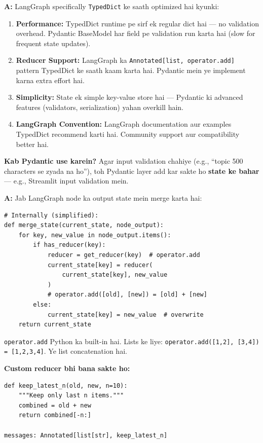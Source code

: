 \documentclass[12pt, a4paper]{article}
\begin{document}
\begin{interviewbox}[title={\faIcon{user-tie} ~Q3: TypedDict kyun use kiya? Pydantic BaseModel kyun nahi?}]
\textbf{A:} LangGraph specifically \texttt{TypedDict} ke saath optimized hai kyunki:

\begin{enumerate}
\item \textbf{Performance:} TypedDict runtime pe sirf ek regular dict hai --- no validation overhead. Pydantic BaseModel har field pe validation run karta hai (slow for frequent state updates).

\item \textbf{Reducer Support:} LangGraph ka \texttt{Annotated[list, operator.add]} pattern TypedDict ke saath kaam karta hai. Pydantic mein ye implement karna extra effort hai.

\item \textbf{Simplicity:} State ek simple key-value store hai --- Pydantic ki advanced features (validators, serialization) yahan overkill hain.

\item \textbf{LangGraph Convention:} LangGraph documentation aur examples TypedDict recommend karti hai. Community support aur compatibility better hai.
\end{enumerate}

\textbf{Kab Pydantic use karein?} Agar input validation chahiye (e.g., ``topic 500 characters se zyada na ho''), toh Pydantic layer add kar sakte ho \textbf{state ke bahar} --- e.g., Streamlit input validation mein.
\end{interviewbox}

\begin{interviewbox}[title={\faIcon{user-tie} ~Q4: \texttt{operator.add} reducer kaise internally kaam karta hai?}]
\textbf{A:} Jab LangGraph node ka output state mein merge karta hai:

\begin{lstlisting}[style=pythonstyle]
# Internally (simplified):
def merge_state(current_state, node_output):
    for key, new_value in node_output.items():
        if has_reducer(key):
            reducer = get_reducer(key)  # operator.add
            current_state[key] = reducer(
                current_state[key], new_value
            )
            # operator.add([old], [new]) = [old] + [new]
        else:
            current_state[key] = new_value  # overwrite
    return current_state
\end{lstlisting}

\texttt{operator.add} Python ka built-in hai. Lists ke liye: \texttt{operator.add([1,2], [3,4]) = [1,2,3,4]}. Ye list concatenation hai.

\textbf{Custom reducer bhi bana sakte ho:}
\begin{lstlisting}[style=pythonstyle]
def keep_latest_n(old, new, n=10):
    """Keep only last n items."""
    combined = old + new
    return combined[-n:]

messages: Annotated[list[str], keep_latest_n]
\end{lstlisting}
\end{interviewbox}
\end{document}
